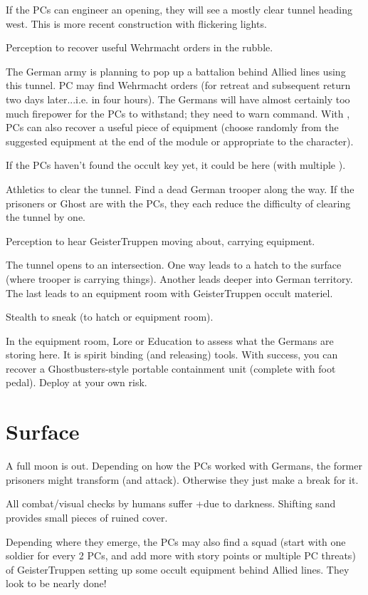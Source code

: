 \documentclass{book}
\newcommand{\df}{\DifficultyDie }
\newcommand{\stb}{\SetbackDie }
\begin{document}
\begin{multicols}{2}
If the PCs can engineer an opening, they will see a mostly clear tunnel heading west.  This is more recent construction with flickering lights.

\df\df Perception to recover useful Wehrmacht orders in the rubble.

The German army is planning to pop up a battalion behind Allied lines using this tunnel.  PC may find Wehrmacht orders (for retreat and subsequent return two days later...i.e. in four hours).  The Germans will have almost certainly too much firepower for the PCs to withstand; they need to warn command.  With \Advantage\Advantage, PCs can also recover a useful piece of equipment (choose randomly from the suggested equipment at the end of the module or appropriate to the character).

If the PCs haven't found the occult key yet, it could be here (with multiple \Advantage).

\df\df\df Athletics to clear the tunnel.  Find a dead German trooper along the way.  
If the prisoners or Ghost are with the PCs, they each reduce the difficulty of clearing the tunnel by one.

\df\df Perception to hear GeisterTruppen moving about, carrying equipment.

The tunnel opens to an intersection.  One way leads to a hatch to the surface (where trooper is carrying things).  Another leads deeper into German territory.  The last leads to an equipment room with GeisterTruppen occult materiel.

\df\df Stealth to sneak (to hatch or equipment room).

In the equipment room, \df\df Lore or \df\df\stb Education to assess what the Germans are storing here.  It is spirit binding (and releasing) tools.  With success, you can recover a Ghostbusters-style portable containment unit (complete with foot pedal).  Deploy at your own risk.

\section{Surface}

A full moon is out.  Depending on how the PCs worked with Germans, the former prisoners might transform (and attack).  Otherwise they just make a break for it.

All combat/visual checks by humans suffer +\stb due to darkness.  Shifting sand provides small pieces of ruined cover.

Depending where they emerge, the PCs may also find a squad (start with one soldier for every 2 PCs, and add more with story points or multiple PC threats) of GeisterTruppen setting up some occult equipment behind Allied lines.  They look to be nearly done!


\end{multicols}
\end{document}
